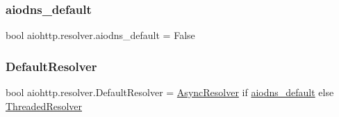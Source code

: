 \mbox{\label{namespaceaiohttp_1_1resolver_a50e4d935ee52f8447014475a8ac42a73}} 
\subsubsection{\texorpdfstring{aiodns\+\_\+default}{aiodns\_default}}
{\footnotesize\ttfamily bool aiohttp.\+resolver.\+aiodns\+\_\+default = False}

\mbox{\label{namespaceaiohttp_1_1resolver_adc1f445daf8808f6a82e0d34ad2f1e75}} 
\subsubsection{\texorpdfstring{Default\+Resolver}{DefaultResolver}}
{\footnotesize\ttfamily bool aiohttp.\+resolver.\+Default\+Resolver = \hyperlink{classaiohttp_1_1resolver_1_1_async_resolver}{Async\+Resolver} if \hyperlink{namespaceaiohttp_1_1resolver_a50e4d935ee52f8447014475a8ac42a73}{aiodns\+\_\+default} else \hyperlink{classaiohttp_1_1resolver_1_1_threaded_resolver}{Threaded\+Resolver}}

